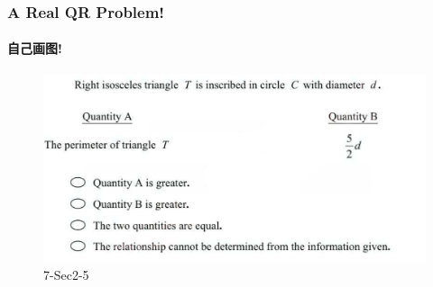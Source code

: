 \documentclass[
	11pt, %
]{beamer}
\begin{document}
\begin{frame}
	\frametitle{A Real QR Problem!}
	\framesubtitle{自己画图!}
	\begin{figure}
		\includegraphics[width=\linewidth]{Inscribe_Example_Question1.png}
		\caption{7-Sec2-5}
	\end{figure}

\end{frame}

\end{document}
